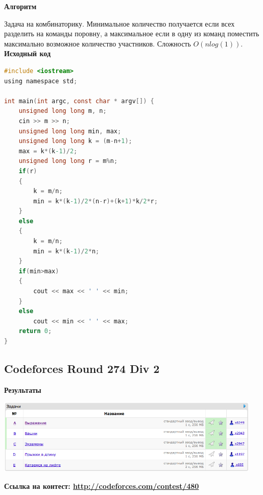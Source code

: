 \documentclass[a4paper,12pt]{article}
\begin{document}
\textbf{{\large Алгоритм}}

Задача на комбинаторику. Минимальное количество получается если всех разделить на команды поровну, а максимальное если в одну из команд поместить максимально возможное количество участников. Сложность $O(nlog(1))$.\\

\textbf{{\large Исходный код}} \\
\begin{lstlisting}[language=C]
#include <iostream>
using namespace std;

int main(int argc, const char * argv[]) {
    unsigned long long m, n;
    cin >> m >> n;
    unsigned long long min, max;
    unsigned long long k = (m-n+1);
    max = k*(k-1)/2;
    unsigned long long r = m%n;
    if(r)
    {
        k = m/n;
        min = k*(k-1)/2*(n-r)+(k+1)*k/2*r;
    }
    else
    {
        k = m/n;
        min = k*(k-1)/2*n;
    }
    if(min>max)
    {
        cout << max << ' ' << min;
    }
    else
        cout << min << ' ' << max;
    return 0;
}
\end{lstlisting}



%
%

\newpage
\subsection{Codeforces Round 274 Div 2}

\textbf{{\large Результаты}} \\
\begin{center}
\includegraphics[width=0.95\textwidth]{C_274/A_C_274_result.png}\\ [1cm]
\end{center}

\textbf{{\large Ссылка на контест: \url{http://codeforces.com/contest/480}}}
\end{document}
